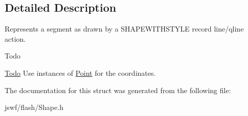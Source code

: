 \subsection{Detailed Description}
Represents a segment as drawn by a {\ttfamily S\+H\+A\+P\+E\+W\+I\+T\+H\+S\+T\+Y\+L\+E} record {\ttfamily line}/{\ttfamily qline} action. 

\begin{DoxyRefDesc}{Todo}
\item[\hyperlink{todo__todo000012}{Todo}]Use instances of \hyperlink{structjswf_1_1flash_1_1_point}{Point} for the coordinates. \end{DoxyRefDesc}


The documentation for this struct was generated from the following file\+:\begin{DoxyCompactItemize}
\item 
jswf/flash/Shape.\+h\end{DoxyCompactItemize}
